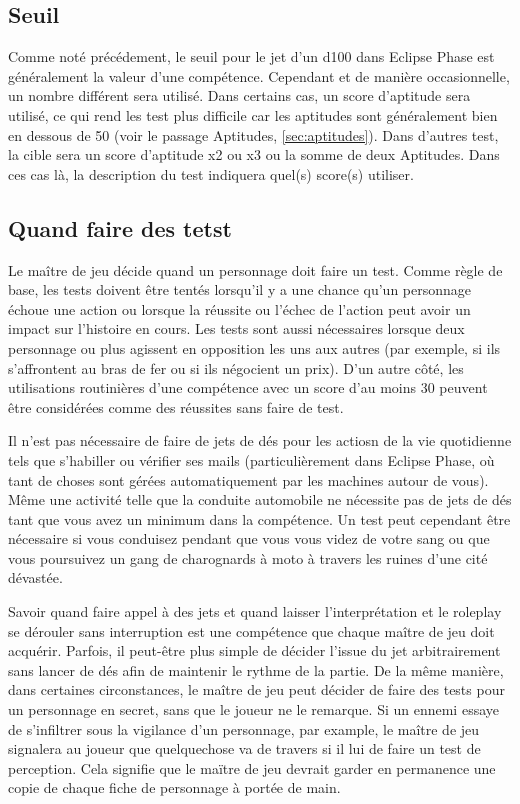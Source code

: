 \subsection{Seuil} \label{sec:target-numbers} 

Comme noté précédement, le seuil pour le jet d'un d100 dans Eclipse Phase est généralement la valeur d'une compétence. Cependant et de manière occasionnelle, un nombre différent sera utilisé. Dans certains cas, un score d'aptitude sera utilisé, ce qui rend les test plus difficile car les aptitudes sont généralement bien en dessous de 50 (voir le passage Aptitudes, \ref{sec:aptitudes}). Dans d'autres test, la cible sera un score d'aptitude x2 ou x3 ou la somme de deux Aptitudes. Dans ces cas là, la description du test indiquera quel(s) score(s) utiliser. 

\subsection{Quand faire des tetst} \label{sec:when-make-tests} 

Le maître de jeu décide quand un personnage doit faire un test. Comme règle de base, les tests doivent être tentés lorsqu'il y a une chance qu'un personnage échoue une action ou lorsque la réussite ou l'échec de l'action peut avoir un impact sur l'histoire en cours. Les tests sont aussi nécessaires lorsque deux personnage ou plus agissent en opposition les uns aux autres (par exemple, si ils s'affrontent au bras de fer ou si ils négocient un prix). D'un autre côté, les utilisations routinières d'une compétence avec un score d'au moins 30 peuvent être considérées comme des réussites sans faire de test. 

Il n'est pas nécessaire de faire de jets de dés pour les actiosn de la vie quotidienne tels que s'habiller ou vérifier ses mails (particulièrement dans Eclipse Phase, où tant de choses sont gérées automatiquement par les machines autour de vous). Même une activité telle que la conduite automobile ne nécessite pas de jets de dés tant que vous avez un minimum dans la compétence. Un test peut cependant être nécessaire si vous conduisez pendant que vous vous videz de votre sang ou que vous poursuivez un gang de charognards à moto à travers les ruines d'une cité dévastée. 

Savoir quand faire appel à des jets et quand laisser l'interprétation et le roleplay se dérouler sans interruption est une compétence que chaque maître de jeu doit acquérir. Parfois, il peut-être plus simple de décider l'issue du jet arbitrairement sans lancer de dés afin de maintenir le rythme de la partie. De la même manière, dans certaines circonstances, le maître de jeu peut décider de faire des tests pour un personnage en secret, sans que le joueur ne le remarque. Si un ennemi essaye de s'infiltrer sous la vigilance d'un personnage, par example, le maître de jeu signalera au joueur que quelquechose va de travers si il lui de faire un test de perception. Cela signifie que le maïtre de jeu devrait garder en permanence une copie de chaque fiche de personnage à portée de main. 

